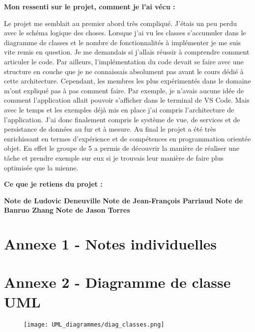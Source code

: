 \documentclass[11pt]{article}
\begin{document}
\bigbreak
\textbf{ Mon ressenti sur le projet, comment je l’ai vécu :  }

Le projet me semblait au premier abord très compliqué. J’étais un peu perdu avec le schéma logique des choses. Lorsque j’ai vu les classes s’accumuler dans le diagramme de classes et le nombre de fonctionnalités à implémenter je me suis vite remis en question. Je me demandais si j’allais réussir à comprendre comment articuler le code. Par ailleurs, l’implémentation du code devait se faire avec une structure en couche que je ne connaissais absolument pas avant le cours dédié à cette architecture. Cependant, les membres les plus expérimentés dans le domaine m’ont expliqué pas à pas comment faire. Par exemple, je n'avais aucune idée de comment l’application allait pouvoir s’afficher dans le terminal de VS Code. Mais avec le temps et les exemples déjà mis en place j’ai compris l’architecture de l’application. J’ai donc finalement compris le système de vue, de services et de persistance de données au fur et à mesure. Au final le projet a été très enrichissant en termes d’expérience et de compétences en programmation orientée objet. En effet le groupe de 5 a permis de découvrir la manière de réaliser une tâche et prendre exemple sur eux si je trouvais leur manière de faire plus optimisée que la mienne. 

\bigbreak
\textbf{ Ce que je retiens du projet :   }

\newpage
\textbf{\Large Note de Ludovic Deneuville}
\newpage
\textbf{\Large Note de Jean-François Parriaud}
\newpage
\textbf{\Large Note de Banruo Zhang}
\newpage
\textbf{\Large Note de Jason Torres}



\appendix  %


\section*{Annexe 1 - Notes individuelles}



\section*{Annexe 2 - Diagramme de classe UML}

\begin{figure}[H]
    \label{UML_classes}
    \centering
    \texttt{[image: UML\_diagrammes/diag\_classes.png]}
\end{figure}



\restoregeometry


\restoregeometry
\end{document}
